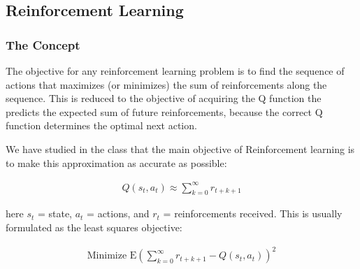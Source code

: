\documentclass{article}
\begin{document}
\subsection{Reinforcement Learning}
\subsubsection{The Concept} The objective for any reinforcement learning problem is to
find the sequence of actions that maximizes (or minimizes) the sum
of reinforcements along the sequence.
This is reduced to the objective of acquiring the Q function the
predicts the expected sum of future reinforcements, because the
correct Q function
determines the optimal next action.\par
We have studied in the class that the main objective of Reinforcement learning is to make this approximation as accurate as possible:

    \begin{align*}
      Q(s_t,a_t) \approx \sum_{k=0}^\infty r_{t+k+1}
    \end{align*}

here $s_t$ = state, $a_t$ = actions, and $r_t$ = reinforcements received.
This is usually formulated as the least squares objective:


    \begin{align*}
      \text{Minimize } \mathrm{E} \left ( \sum_{k=0}^\infty r_{t+k+1} - Q(s_t,a_t)\right )^2
    \end{align*}
\end{document}
